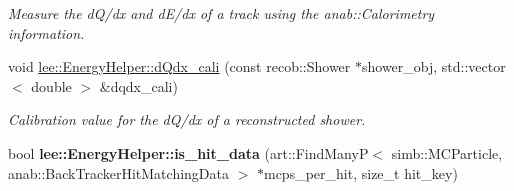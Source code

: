 \begin{DoxyCompactItemize}
\begin{DoxyCompactList}\small\item\em Measure the d\-Q/dx and d\-E/dx of a track using the anab\-::\-Calorimetry information. \end{DoxyCompactList}\item 
void \hyperlink{group__lee_ga4926738bfba2d91bc187ad8a7db6e997}{lee\-::\-Energy\-Helper\-::d\-Qdx\-\_\-cali} (const recob\-::\-Shower $\ast$shower\-\_\-obj, std\-::vector$<$ double $>$ \&dqdx\-\_\-cali)
\begin{DoxyCompactList}\small\item\em Calibration value for the d\-Q/dx of a reconstructed shower. \end{DoxyCompactList}\item 
\hypertarget{group__lee_ga21b60eb8e5ccee6f04a795d319d5c0ee}{bool {\bfseries lee\-::\-Energy\-Helper\-::is\-\_\-hit\-\_\-data} (art\-::\-Find\-Many\-P$<$ simb\-::\-M\-C\-Particle, anab\-::\-Back\-Tracker\-Hit\-Matching\-Data $>$ $\ast$mcps\-\_\-per\-\_\-hit, size\-\_\-t hit\-\_\-key)}\label{group__lee_ga21b60eb8e5ccee6f04a795d319d5c0ee}


\end{DoxyCompactItemize}
